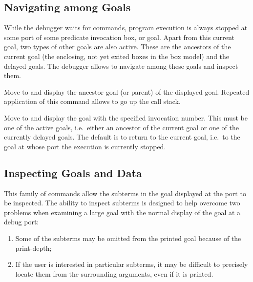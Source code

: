 \subsection{Navigating among Goals}

While the debugger waits for commands, program execution is always
stopped at some port of some predicate invocation box, or goal.
Apart from this current goal, two types of other goals are also active.
These are the ancestors of the current goal (the enclosing, not yet
exited boxes in the box model) and the delayed goals.
The debugger allows to navigate among these goals and inspect them.

\begin{descr}{1cm}

Move to and display the ancestor goal (or parent) of the displayed goal.
Repeated application of this command allows to go up the call stack.

Move to and display the goal with the specified invocation number.
This must be one of the active goals, i.e.\ either an ancestor of the
current goal or one of the currently delayed goals. 
The default is to return to the current goal, i.e.\ to the goal at
whose port the execution is currently stopped.
\end{descr}

\subsection{Inspecting Goals and Data}

This family of commands allow the subterms in the goal displayed at the
port to be inspected.
The ability to inspect subterms is designed to help overcome two problems
when examining a large goal with the normal display of the goal at a debug
port: 
\begin{enumerate}
\item Some of the subterms may be omitted from the printed goal because
of the print-depth; 

\item If the user is interested in particular subterms, it
may be difficult to precisely locate them from the surrounding arguments,
even if it is printed.
\end{enumerate}

